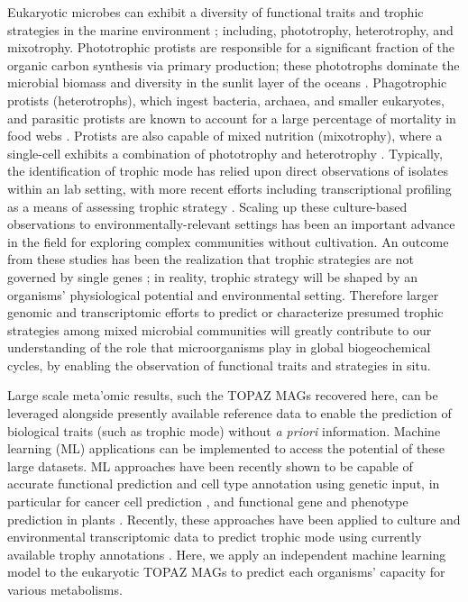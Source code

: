 \documentclass[12pt]{article}
\numberwithin{equation}{section}
\begin{document}
Eukaryotic microbes can exhibit a diversity of functional traits and trophic strategies in the marine environment \citep{Worden2015} \citep{Caron2011Marine}; including, phototrophy, heterotrophy, and mixotrophy. Phototrophic protists are responsible for a significant fraction of the organic carbon synthesis via primary production; these phototrophs dominate the microbial biomass and diversity in the sunlit layer of the oceans \citep{Worden2015,de_Vargas_2015}. Phagotrophic protists (heterotrophs), which ingest bacteria, archaea, and smaller eukaryotes, and parasitic protists are known to account for a large percentage of mortality in food webs \citep{Sherr_2002, Caron2011Marine, Worden2015}. Protists are also capable of mixed nutrition (mixotrophy), where a single-cell exhibits a combination of phototrophy and heterotrophy \citep{Stoecker_2017}. Typically, the identification of trophic mode has relied upon direct observations of isolates within an lab setting, with more recent efforts including transcriptional profiling as a means of assessing trophic strategy \citep{Keeling2014, Liu_2016}. Scaling up these culture-based observations to environmentally-relevant settings \citep{Alexander2015a, hu2018,Gong_2016} has been an important advance in the field for exploring complex communities without cultivation. An outcome from these studies has been the realization that trophic strategies are not governed by single genes \citep{Labarre_2020}; in reality, trophic strategy will be shaped by an organisms' physiological potential and environmental setting. Therefore larger genomic and transcriptomic efforts to predict or characterize presumed trophic strategies among mixed microbial communities will greatly contribute to our understanding of the role that microorganisms play in global biogeochemical cycles, by enabling the observation of functional traits and strategies in situ. 

Large scale meta'omic results, such the TOPAZ MAGs recovered here, can be leveraged alongside presently available reference data to enable the prediction of biological traits (such as trophic mode) without \textit{a priori} information. Machine learning (ML) applications can be implemented to access the potential of these large datasets. ML approaches have been recently shown to be capable of accurate functional prediction and cell type annotation using genetic input, in particular for cancer cell prediction \citep{shipp2002diffuse,bashiri2017improving,tabl2019machine}, and functional gene and phenotype prediction in plants \citep{mahood2020machine}. Recently, these approaches have been applied to culture and environmental transcriptomic data to predict trophic mode using currently available trophy annotations \citep{lambert2021dynamic, burns2018gene,Jimenez_2021}. Here, we apply an independent machine learning model to the eukaryotic TOPAZ MAGs to predict each organisms' capacity for various metabolisms.
\end{document}
